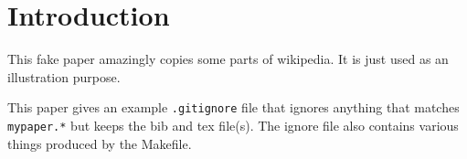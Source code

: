 \section{Introduction}
\label{sec:intro}

This fake paper amazingly copies some parts of wikipedia.
It is just used as an illustration purpose.

This paper gives an example {\tt .gitignore} file that ignores anything that matches {\tt mypaper.*} but keeps the bib and tex file(s).
The ignore file also contains various things produced by the Makefile.

